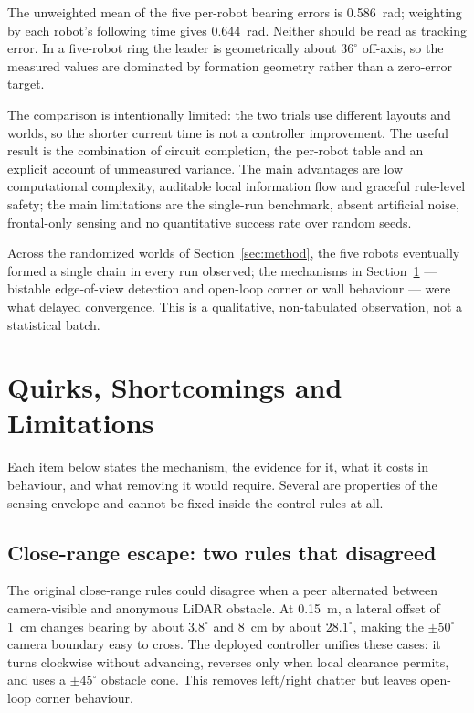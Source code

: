 \documentclass[conference,a4paper]{IEEEtran}
\begin{document}
The unweighted mean of the five per-robot bearing errors is
\SI{0.586}{\radian}; weighting by each robot's following time gives
\SI{0.644}{\radian}. Neither should be read as tracking error. In a five-robot
ring the leader is geometrically about $36^\circ$ off-axis, so the measured
values are dominated by formation geometry rather than a zero-error target.

The comparison is intentionally limited: the two trials use different
layouts and worlds, so the shorter current time is not a controller
improvement. The useful result is the combination of circuit completion, the
per-robot table and an explicit account of unmeasured variance. The main
advantages are low computational complexity, auditable local information
flow and graceful rule-level safety; the main limitations are the single-run
benchmark, absent artificial noise, frontal-only sensing and no quantitative
success rate over random seeds.

Across the randomized worlds of Section~\ref{sec:method}, the five robots
eventually formed a single chain in every run observed; the mechanisms in
Section~\ref{sec:limitations} --- bistable edge-of-view detection and
open-loop corner or wall behaviour --- were what delayed convergence. This
is a qualitative, non-tabulated observation, not a statistical batch.

\section{Quirks, Shortcomings and Limitations}
\label{sec:limitations}
Each item below states the mechanism, the evidence for it, what it costs in
behaviour, and what removing it would require. Several are properties of the
sensing envelope and cannot be fixed inside the control rules at all.

\subsection{Close-range escape: two rules that disagreed}
\label{sec:esc}
The original close-range rules could disagree when a peer alternated between
camera-visible and anonymous LiDAR obstacle. At \SI{0.15}{\metre}, a lateral
offset of \SI{1}{\centi\metre} changes bearing by about $3.8^\circ$ and
\SI{8}{\centi\metre} by about $28.1^\circ$, making the $\pm50^\circ$ camera
boundary easy to cross. The deployed controller unifies these cases: it turns
clockwise without advancing, reverses only when local clearance permits, and
uses a $\pm45^\circ$ obstacle cone. This removes left/right chatter but leaves
open-loop corner behaviour.
\end{document}
